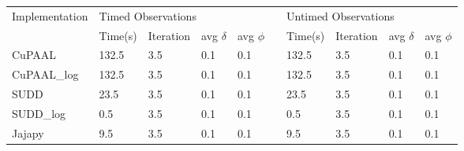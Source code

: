 \begin{tabular}{llllllllll}
    \toprule
    \multirow{2}{*}{Implementation} & \multicolumn{5}{l}{Timed Observations} & \multicolumn{4}{l}{Untimed Observations} \\ \cmidrule{2-10}
    & Time(s)       & Iteration      & avg $\delta$       & avg $\phi$ & & Time(s)       & Iteration      & avg $\delta$       & avg $\phi$ \\ \cmidrule{1-1}  
    CuPAAL & 132.5 & 3.5 & 0.1 & 0.1 & & 132.5 & 3.5 & 0.1 & 0.1 \\
    CuPAAL\_log & 132.5 & 3.5 & 0.1 & 0.1 & &  132.5 & 3.5 & 0.1 & 0.1 \\
    SUDD &  23.5 & 3.5 & 0.1 & 0.1 & & 23.5 & 3.5 & 0.1 & 0.1 \\
    SUDD\_log &  0.5 & 3.5 & 0.1 & 0.1 & & 0.5 & 3.5 & 0.1 & 0.1 \\
    Jajapy &  9.5 & 3.5 & 0.1 & 0.1 & & 9.5 & 3.5 & 0.1 & 0.1 \\
    \bottomrule
    \end{tabular}